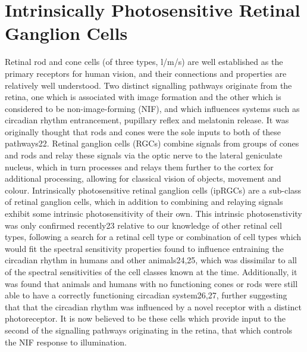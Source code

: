 \section{Intrinsically Photosensitive Retinal Ganglion Cells}
Retinal rod and cone cells (of three types, l/m/s) are well established as the primary receptors for human vision, and their connections and properties are relatively well understood. Two distinct signalling pathways originate from the retina, one which is associated with image formation and the other which is considered to be non-image-forming (NIF), and which influences systems such as circadian rhythm entrancement, pupillary reflex and melatonin release. It was originally thought that rods and cones were the sole inputs to both of these pathways22.
Retinal ganglion cells (RGCs) combine signals from groups of cones and rods and relay these signals via the optic nerve to the lateral geniculate nucleus, which in turn processes and relays them further to the cortex for additional processing, allowing for classical vision of objects, movement and colour. Intrinsically photosensitive retinal ganglion cells (ipRGCs) are a sub-class of retinal ganglion cells, which in addition to combining and relaying signals exhibit some intrinsic photosensitivity of their own. 
This intrinsic photosenstivity was only confirmed recently23 relative to our knowledge of other retinal cell types, following a search for a retinal cell type or combination of cell types which would fit the spectral sensitivity properties found to influence entraining the circadian rhythm in humans and other animals24,25, which was dissimilar to all of the spectral sensitivities of the cell classes known at the time. Additionally, it was found that animals and humans with no functioning cones or rods were still able to have a correctly functioning circadian system26,27, further suggesting that that the circadian rhythm was influenced by a novel receptor with a distinct photoreceptor. It is now believed to be these cells which provide input to the second of the signalling pathways originating in the retina, that which controls the NIF response to illumination.

